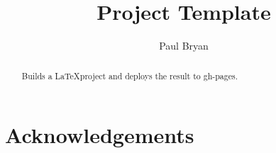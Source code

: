 \documentclass[11pt]{amsart}
\date{}
\author{Paul Bryan}
\title{Project Template}
\begin{document}
\maketitle
\begin{abstract}
Builds a \LaTeX project and deploys the result to gh-pages.
\end{abstract}

\section*{Acknowledgements}

\printbibliography
\end{document}
